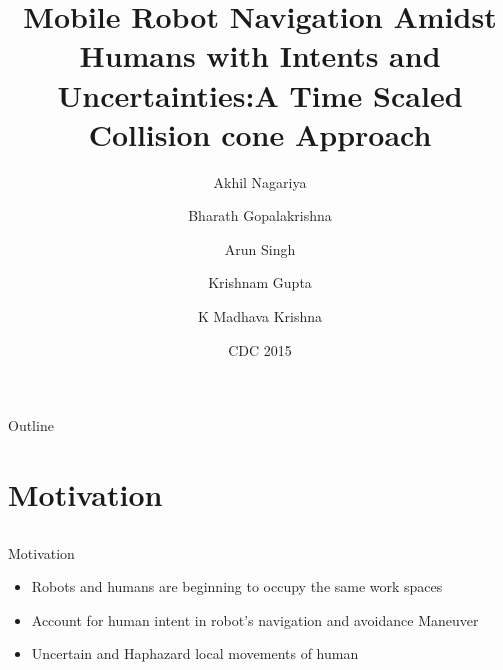 \documentclass{beamer}
\title{Mobile Robot Navigation Amidst Humans with Intents and Uncertainties:A Time Scaled Collision cone Approach}
\subtitle{}
\author{Akhil Nagariya\inst{1} \and Bharath Gopalakrishna\inst{1} \and Arun Singh\inst{2} \and Krishnam Gupta \inst{1} \and K Madhava Krishna \inst{1}}
\institute[Universities of Somewhere and Elsewhere] %
{
  \inst{1}%
  RRC\\
  IIIT Hyderabad
  \and
  \inst{2}%
  Ben-Gurion University, Isreal
  }
\date{CDC 2015}
\begin{document}
\begin{frame}
  \titlepage
\end{frame}

\begin{frame}{Outline}
  \tableofcontents
\end{frame}

\section{Motivation}


\subsection{}

\begin{frame}{Motivation}
  \begin{itemize}
  \item {
   Robots and humans are beginning to occupy the same work spaces
  }
  \item {
   Account for human intent in robot's navigation and avoidance Maneuver
  }
  \item {
    Uncertain and Haphazard local movements of human 
  }
  \end{itemize}
\end{frame}



\end{document}
